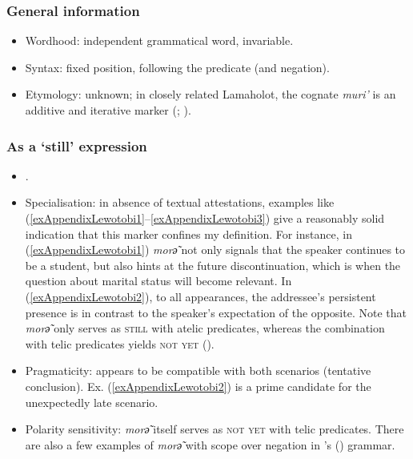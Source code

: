 \subsubsection{General information}
\begin{itemize}
	\item Wordhood: independent grammatical word, invariable.
	\item Syntax: fixed position, following the predicate (and negation).
	\item Etymology: unknown; in closely related Lamaholot, the cognate \textit{muri\rq} is an additive and iterative marker (\cite{NishiyamaKelen2007}; \cite{Pampus2010}).
\end{itemize}

\subsubsection{As a \lq{}still\rq{ }expression}
\begin{itemize}
	\item \textcite[414–416]{Nagaya2012}.
	\item Specialisation: in absence of textual attestations, examples like (\ref{exAppendixLewotobi1}–\ref{exAppendixLewotobi3}) give a reasonably solid indication that this marker confines my definition. For instance, in (\ref{exAppendixLewotobi1}) \mbox{\textit{morә̃}} not only signals that the speaker continues to be a student, but also hints at the future discontinuation, which is when the question about marital status will become relevant. In (\ref{exAppendixLewotobi2}), to all appearances, the addressee's persistent presence is in contrast to the speaker's expectation of the opposite. Note that \mbox{\textit{morә̃}} only serves as \textsc{still} with atelic predicates, whereas the combination with telic predicates yields \textsc{not yet} ().	
	\item Pragmaticity: appears to be compatible with both scenarios (tentative conclusion). Ex. (\ref{exAppendixLewotobi2}) is a prime candidate for the unexpectedly late scenario.
	\item Polarity sensitivity: \textit{morә̃} itself serves as \textsc{not yet} with telic predicates. There are also a few examples of \textit{morә̃} with scope over negation in \citeauthor{Nagaya2012}'s (\citeyear{Nagaya2012}) grammar.
	\end{itemize}

